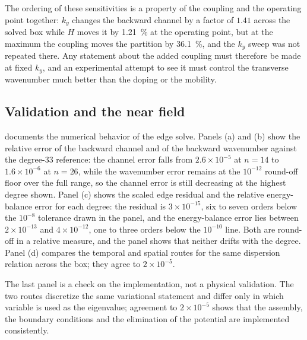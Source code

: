 The ordering of these sensitivities is a property of the coupling and the operating point together: $k_y$ changes the backward channel by a factor of $1.41$ across the solved box while $H$ moves it by \SI{1.21}{\percent} at the operating point, but at the maximum the coupling moves the partition by \SI{36.1}{\percent}, and the $k_y$ sweep was not repeated there.  Any statement about the added coupling must therefore be made at fixed $k_y$, and an experimental attempt to see it must control the transverse wavenumber much better than the doping or the mobility.

\subsection{Validation and the near field}
\label{sec:results_validation}
\label{sec:results_field}

 documents the numerical behavior of the edge solve.  Panels
(a) and (b) show the relative error of the backward channel and of the backward
wavenumber against the degree-33 reference: the channel error falls from
$2.6\times10^{-5}$ at $n=14$ to $1.6\times10^{-6}$ at $n=26$, while the wavenumber error remains at the $10^{-12}$ round-off floor over the full range, so the channel
error is still decreasing at the highest degree shown.  Panel (c)
shows the scaled edge residual and the relative energy-balance error for each degree: the residual is $3\times10^{-15}$, six to seven orders below the
$10^{-8}$ tolerance drawn in the panel, and the energy-balance error lies between $2\times10^{-13}$ and $4\times10^{-12}$, one to three orders below the
$10^{-10}$ line.  Both are round-off in a relative measure, and the panel
shows that neither drifts with the degree.  Panel (d) compares the temporal and spatial routes for the same
dispersion relation across the box; they agree to $2\times10^{-5}$.

The last panel is a check on the implementation, not a physical validation.  The
two routes discretize the same variational statement and differ only in which
variable is used as the eigenvalue; agreement to $2\times10^{-5}$ shows that the
assembly, the boundary conditions and the elimination of the potential are
implemented consistently.

